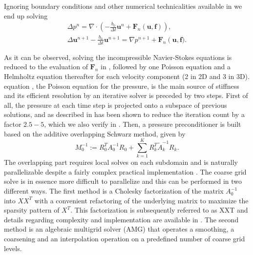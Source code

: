 \documentclass{sig-alternate}
\begin{document}
Ignoring boundary conditions and other numerical technicalities available in \cite{Tomboulides1997} we end up solving
\begin{eqnarray}
 \Delta p^{n} = \nabla \cdot \left( -\frac{b_0}{\Delta t} \mathbf{u}^{n} + \mathbf{F}_n \left( \mathbf{u},\mathbf f \right) \right), \label{eqn:hmhz_pres}\\
 \Delta \mathbf{u}^{n+1}- \frac{b_0}{\Delta t} \mathbf{u}^{n+1}  =  \nabla p^{n+1} + \mathbf{F}_n \left( \mathbf{u}, \mathbf f) \right. . \label{eqn:hmhz_vel}
\end{eqnarray}

As it can be observed, solving the incompressible Navier-Stokes equations is reduced 
to the evaluation of $\mathbf{F}_n$ in , followed by one Poisson 
equation and a Helmholtz equation thereafter for each velocity component (2 in 2D and 3 in 3D). 
equation , the Poisson equation for the pressure, is the main 
source of stiffness and its efficient resolution by an iterative solver is preceded 
by two steps. First of all, the pressure at each time step is projected onto a 
subspace of previous solutions, and as described in \cite{Fischer1998} has been shown 
to reduce the iteration count by a factor $2.5-5$, which we also verify in .
Then, a pressure preconditioner is built based on the additive overlapping Schwarz 
method, given by 
\begin{equation}
 M_0^{-1} := R_0^T A_{0}^{-1} R_0 + \sum_{k=1}^{K} R_k^T \tilde{A}_k^{-1} R_k.
\end{equation}
The overlapping part requires local solves on each subdomain and is naturally parallelizable 
despite a fairly complex practical implementation \cite{Fischer199784,Fischer2005}. 
The coarse grid solve is in essence more difficult to parallelize and this can be 
performed in two different ways. The first 
method is a Cholesky factorization of the matrix $A_0^{-1}$ into $XX^T$ with a 
convenient refactoring of the underlying matrix to maximize the sparsity pattern 
of $X^T$. This factorization is subsequently referred to as XXT and details 
regarding complexity and implementation are available in \cite{Tufo2001151}. The 
second method is an algebraic multigrid solver (AMG) that operates a smoothing, 
a coarsening and an interpolation operation on a predefined number of coarse grid 
levels. 
\end{document}
